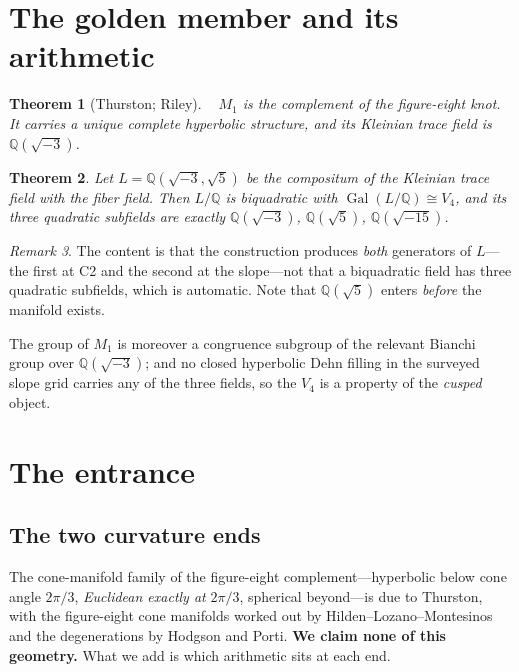 \documentclass[11pt,reqno]{amsart}
\theoremstyle{plain}
\newtheorem{theorem}{Theorem}[section]
\theoremstyle{definition}
\theoremstyle{remark}
\newtheorem{remark}[theorem]{Remark}
\newcommand{\Q}{\mathbb{Q}}
\newcommand{\Gal}{\operatorname{Gal}}
\begin{document}
\section{The golden member and its arithmetic}\label{sec:arith}

\begin{theorem}[Thurston; Riley]\label{thm:thurston}~\cite{Riley}
$M_1$ is the complement of the figure-eight knot. It carries a unique complete
hyperbolic structure, and its Kleinian trace field is $\Q(\sqrt{-3})$.
\end{theorem}

\begin{theorem}\label{thm:v4}
Let $L=\Q(\sqrt{-3},\sqrt5)$ be the compositum of the Kleinian trace field with the
fiber field. Then $L/\Q$ is biquadratic with $\Gal(L/\Q)\cong V_4$, and its three
quadratic subfields are exactly $\Q(\sqrt{-3})$, $\Q(\sqrt5)$, $\Q(\sqrt{-15})$.
\end{theorem}

\begin{remark}
The content is that the construction produces \emph{both} generators of $L$---the first
at C2 and the second at the slope---not that a biquadratic field has three quadratic
subfields, which is automatic. Note that $\Q(\sqrt5)$ enters \emph{before} the manifold
exists.
\end{remark}

The group of $M_1$ is moreover a congruence subgroup of the relevant Bianchi group over
$\Q(\sqrt{-3})$; and no closed hyperbolic Dehn filling in the surveyed slope grid
carries any of the three fields, so the $V_4$ is a property of the \emph{cusped} object.

\section{The entrance}\label{sec:entrance}

\subsection{The two curvature ends}
The cone-manifold family of the figure-eight complement---hyperbolic below cone angle
$2\pi/3$, \emph{Euclidean exactly at} $2\pi/3$, spherical beyond---is due to Thurston,
with the figure-eight cone manifolds worked out by
Hilden--Lozano--Montesinos~\cite{HLM95} and the degenerations by Hodgson and Porti.
\textbf{We claim none of this geometry.} What we add is which arithmetic sits at each
end.
\end{document}
